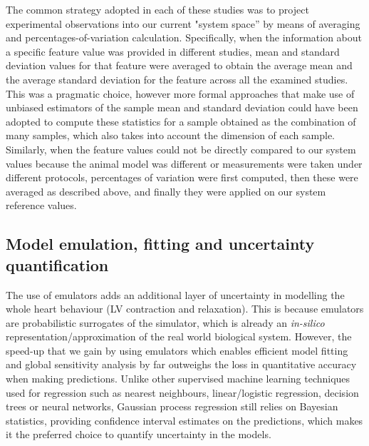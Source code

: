 \vspace{0.2cm}
The common strategy adopted in each of these studies was to project experimental observations into our current "system space'' by means of averaging and percentages-of-variation calculation. Specifically, when the information about a specific feature value was provided in different studies, mean and standard deviation values for that feature were averaged to obtain the average mean and the average standard deviation for the feature across all the examined studies. This was a pragmatic choice, however more formal approaches that make use of unbiased estimators of the sample mean and standard deviation could have been adopted to compute these statistics for a sample obtained as the combination of many samples, which also takes into account the dimension of each sample. Similarly, when the feature values could not be directly compared to our system values because the animal model was different or measurements were taken under different protocols, percentages of variation were first computed, then these were averaged as described above, and finally they were applied on our system reference values.


%
%
%
\subsection{Model emulation, fitting and uncertainty quantification}\label{sec:ch9model_emulation_fitting_and_uncertainty_quantification}
The use of emulators adds an additional layer of uncertainty in modelling the whole heart behaviour (LV contraction and relaxation). This is because emulators are probabilistic surrogates of the simulator, which is already an \textit{in-silico} representation/approximation of the real world biological system. However, the speed-up that we gain by using emulators which enables efficient model fitting and global sensitivity analysis by far outweighs the loss in quantitative accuracy when making predictions. Unlike other supervised machine learning techniques used for regression such as nearest neighbours, linear/logistic regression, decision trees or neural networks, Gaussian process regression still relies on Bayesian statistics, providing confidence interval estimates on the predictions, which makes it the preferred choice to quantify uncertainty in the models.

